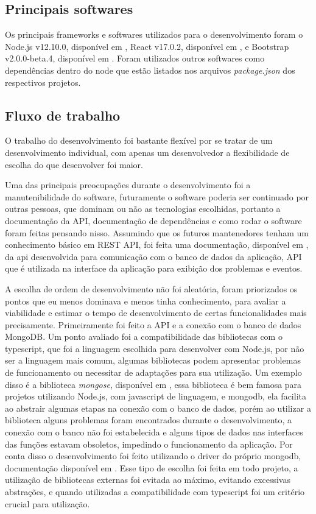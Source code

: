 \subsection{Principais softwares}

Os principais frameworks e softwares utilizados para o desenvolvimento foram o Node.js v12.10.0, disponível em \cite{nodejs},  React v17.0.2, disponível em \cite{react}, e Bootstrap v2.0.0-beta.4, disponível em \cite{react:bootstrap}. Foram utilizados outros softwares como dependências dentro do node que estão listados nos arquivos \textit{package.json} dos respectivos projetos.

\subsection{Fluxo de trabalho}

O trabalho do desenvolvimento foi bastante flexível por se tratar de um desenvolvimento individual, com apenas um desenvolvedor a flexibilidade de escolha do que desenvolver foi maior.

Uma das principais preocupações durante o desenvolvimento foi a manutenibilidade do software, futuramente o software poderia ser continuado por outras pessoas, que dominam ou não as tecnologias escolhidas, portanto a documentação da API, documentação de dependências e como rodar o software foram feitas pensando nisso. Assumindo que os futuros mantenedores tenham um conhecimento básico em REST API, foi feita uma documentação, disponível em \cite{doc:gamajudge:api}, da api desenvolvida para comunicação com o banco de dados da aplicação, API que é utilizada na interface da aplicação para exibição dos problemas e eventos.

A escolha de ordem de desenvolvimento não foi aleatória, foram priorizados os pontos que eu menos dominava e menos tinha conhecimento, para avaliar a viabilidade e estimar o tempo de desenvolvimento de certas funcionalidades mais precisamente. Primeiramente foi feito a API e a conexão com o banco de dados MongoDB. Um ponto avaliado foi a compatibilidade das bibliotecas com o typescript, que foi a linguagem escolhida para desenvolver com Node.js, por não ser a linguagem mais comum, algumas bibliotecas podem apresentar problemas de funcionamento ou necessitar de adaptações para sua utilização. Um exemplo disso é a biblioteca \textit{mongose}, disponível em \cite{mongose}, essa biblioteca é bem famosa para projetos utilizando Node.js, com javascript de linguagem, e mongodb, ela facilita ao abstrair algumas etapas na conexão com o banco de dados, porém ao utilizar a biblioteca alguns problemas foram encontrados durante o desenvolvimento, a conexão com o banco não foi estabelecida e alguns tipos de dados nas interfaces das funções estavam obsoletos, impedindo o funcionamento da aplicação. Por conta disso o desenvolvimento foi feito utilizando o driver do próprio mongodb, documentação disponível em \cite{doc:mongodb:node}. Esse tipo de escolha foi feita em todo projeto, a utilização de bibliotecas externas foi evitada ao máximo, evitando excessivas abstrações, e quando utilizadas a compatibilidade com typescript foi um critério crucial para utilização.

